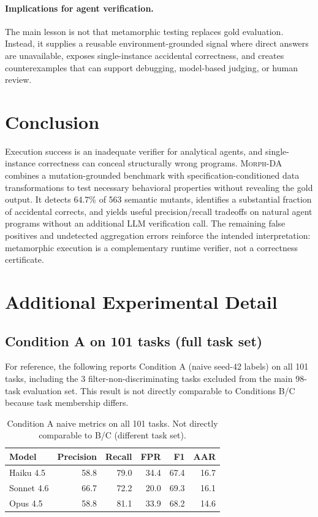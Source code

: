 \documentclass{article}
\newcommand{\morph}{\textsc{Morph-DA}\xspace}
\begin{document}
\paragraph{Implications for agent verification.}
The main lesson is not that metamorphic testing replaces gold evaluation. Instead, it supplies a reusable environment-grounded signal where direct answers are unavailable, exposes single-instance accidental correctness, and creates counterexamples that can support debugging, model-based judging, or human review.

\section{Conclusion}

Execution success is an inadequate verifier for analytical agents, and single-instance correctness can conceal structurally wrong programs. \morph combines a mutation-grounded benchmark with specification-conditioned data transformations to test necessary behavioral properties without revealing the gold output. It detects 64.7\% of 563 semantic mutants, identifies a substantial fraction of accidental corrects, and yields useful precision/recall tradeoffs on natural agent programs without an additional LLM verification call. The remaining false positives and undetected aggregation errors reinforce the intended interpretation: metamorphic execution is a complementary runtime verifier, not a correctness certificate.




\clearpage
\appendix

\section{Additional Experimental Detail}

\subsection{Condition A on 101 tasks (full task set)}
\label{app:cond_a_full}
For reference, the following reports Condition A (naive seed-42 labels) on all 101 tasks, including the 3 filter-non-discriminating tasks excluded from the main 98-task evaluation set. This result is not directly comparable to Conditions B/C because task membership differs.

\begin{table}[h]
\centering
\caption{Condition A naive metrics on all 101 tasks. Not directly comparable to B/C (different task set).}
\small
\begin{tabular}{lrrrrr}
\toprule
Model & Precision & Recall & FPR & F1 & AAR \\
\midrule
Haiku 4.5 & 58.8 & 79.0 & 34.4 & 67.4 & 16.7 \\
Sonnet 4.6 & 66.7 & 72.2 & 20.0 & 69.3 & 16.1 \\
Opus 4.5 & 58.8 & 81.1 & 33.9 & 68.2 & 14.6 \\
\bottomrule
\end{tabular}
\end{table}
\end{document}
